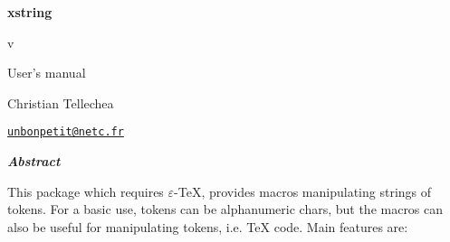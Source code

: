 \documentclass[english,a4paper,10pt]{article}
\def\xstringenglishdateaux#1/#2/#3\nil{\number#3\relax\space \ifcase #2 \or January\or February\or March\or April\or May\or June\or July\or August\or September\or October\or November\or December\fi\space#1}
\edef\xstringenglishdate{\expandafter\xstringenglishdateaux\xstringdate\nil}
\begin{document}
\setlength{\parindent}{0pt}
\begin{titlepage}
	\null\par\vfill
	\begin{center}
		\begin{minipage}{0.75\linewidth}
			\begin{center}
				\Huge\bfseries xstring\par\vspace{5pt}
				\small v\xstringversion\par\vspace{25pt}
				\normalsize User's manual
			\end{center}
		\end{minipage}
	\end{center}
	\vspace{1cm}
	\begin{center}
		Christian {\sc Tellechea}\par\small
		\href{mailto:unbonpetit@netc.fr}{\nolinkurl{unbonpetit@netc.fr}}\par\vspace{5pt}
		\xstringenglishdate
	\end{center}
	\vfill\hrulefill
	\begin{center}
		\begin{minipage}{0.85\linewidth}
			\noindent
			\hfill\textbf{\textit{Abstract}}\hfill{}\medskip\par
			This package which requires $\varepsilon$-\TeX{}, provides macros manipulating strings of tokens. For a basic use, tokens can be alphanumeric chars, but the macros can also be useful for manipulating tokens, i.e. \TeX{} code. Main features are:\smallskip


\end{minipage}
\end{center}
\end{titlepage}
\end{document}
